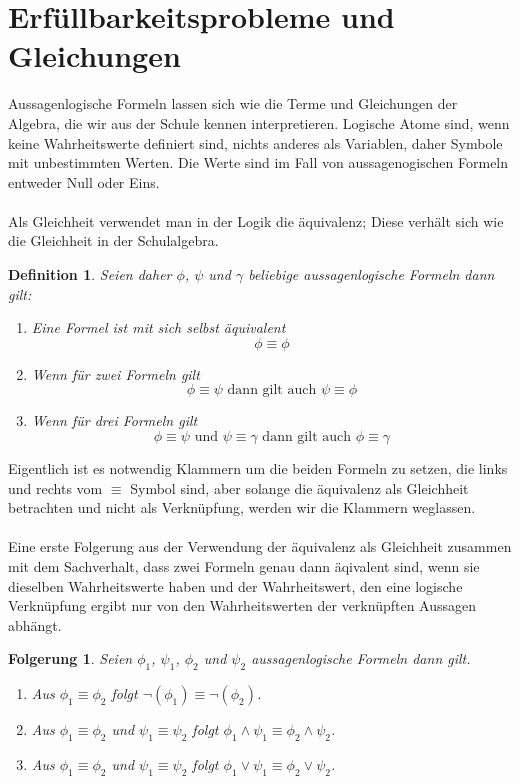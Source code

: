 \documentclass[11pt,a4paper,leqno]{report}
\newtheorem{definition}[theorem]{Definition}
\newtheorem{corollary}[theorem]{Folgerung}
\numberwithin{equation}{chapter}
\begin{document}
\section{Erf\"ullbarkeitsprobleme und Gleichungen}
Aussagenlogische Formeln lassen sich wie die Terme und Gleichungen der Algebra, die wir aus der Schule kennen interpretieren. Logische Atome sind, wenn keine Wahrheitswerte definiert sind, nichts anderes als Variablen, daher Symbole mit unbestimmten Werten. Die Werte sind im Fall von aussagenogischen Formeln entweder Null oder Eins.\\
\\
Als Gleichheit verwendet man in der Logik die \"aquivalenz; Diese verh\"alt sich wie die Gleichheit in der Schulalgebra.
\begin{definition}
	Seien daher $\phi$, $\psi$ und $\gamma$ beliebige aussagenlogische Formeln dann gilt:
	\begin{enumerate}
		\item Eine Formel ist mit sich selbst \"aquivalent
		\begin{equation}
			\phi\equiv\phi
		\end{equation}
		\item Wenn f\"ur zwei Formeln gilt
		\begin{equation}
		\phi\equiv\psi \text{ dann gilt auch } \psi\equiv\phi
		\end{equation}
		\item Wenn f\"ur drei Formeln gilt
		\begin{equation}
		\phi\equiv\psi \text{ und } \psi\equiv\gamma\text{ dann gilt auch }\phi\equiv\gamma
		\end{equation}
	\end{enumerate}
\end{definition}
Eigentlich ist es notwendig Klammern um die beiden Formeln zu setzen, die links und rechts vom $\equiv$ Symbol sind, aber solange die \"aquivalenz als Gleichheit betrachten und nicht als Verkn\"upfung, werden wir die Klammern weglassen.
\\
\\
Eine erste Folgerung aus der Verwendung der \"aquivalenz als Gleichheit zusammen mit dem Sachverhalt, dass zwei Formeln genau dann \"aqivalent sind, wenn sie dieselben Wahrheitswerte haben und der Wahrheitswert, den eine logische Verkn\"upfung ergibt nur von den Wahrheitswerten der verkn\"upften Aussagen abh\"angt.
\begin{corollary}
	Seien $\phi_1$, $\psi_1$, $\phi_2$ und $\psi_2$ aussagenlogische Formeln dann gilt.
	\begin{enumerate}
		\item Aus $\phi_1\equiv\phi_2$ folgt $\neg(\phi_1)\equiv\neg(\phi_2)$.
		\item Aus $\phi_1\equiv\phi_2$ und $\psi_1\equiv\psi_2$ folgt $\phi_1\wedge\psi_1\equiv\phi_2\wedge\psi_2$.
		\item Aus $\phi_1\equiv\phi_2$ und $\psi_1\equiv\psi_2$ folgt $\phi_1\vee\psi_1\equiv\phi_2\vee\psi_2$.
	\end{enumerate}
\end{corollary}
\end{document}
